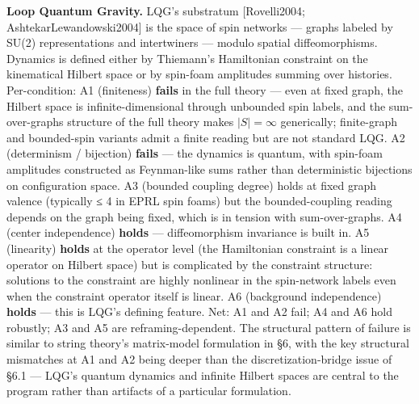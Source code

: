 \documentclass[
]{article}
\begin{document}
\textbf{Loop Quantum Gravity.} LQG's substratum {[}Rovelli2004;
AshtekarLewandowski2004{]} is the space of spin networks --- graphs
labeled by SU(2) representations and intertwiners --- modulo spatial
diffeomorphisms. Dynamics is defined either by Thiemann's Hamiltonian
constraint on the kinematical Hilbert space or by spin-foam amplitudes
summing over histories. Per-condition: A1 (finiteness) \textbf{fails} in
the full theory --- even at fixed graph, the Hilbert space is
infinite-dimensional through unbounded spin labels, and the
sum-over-graphs structure of the full theory makes \(|S| = \infty\)
generically; finite-graph and bounded-spin variants admit a finite
reading but are not standard LQG. A2 (determinism / bijection)
\textbf{fails} --- the dynamics is quantum, with spin-foam amplitudes
constructed as Feynman-like sums rather than deterministic bijections on
configuration space. A3 (bounded coupling degree) holds at fixed graph
valence (typically ≤ 4 in EPRL spin foams) but the bounded-coupling
reading depends on the graph being fixed, which is in tension with
sum-over-graphs. A4 (center independence) \textbf{holds} ---
diffeomorphism invariance is built in. A5 (linearity) \textbf{holds} at
the operator level (the Hamiltonian constraint is a linear operator on
Hilbert space) but is complicated by the constraint structure: solutions
to the constraint are highly nonlinear in the spin-network labels even
when the constraint operator itself is linear. A6 (background
independence) \textbf{holds} --- this is LQG's defining feature. Net: A1
and A2 fail; A4 and A6 hold robustly; A3 and A5 are reframing-dependent.
The structural pattern of failure is similar to string theory's
matrix-model formulation in §6, with the key structural mismatches at A1
and A2 being deeper than the discretization-bridge issue of §6.1 ---
LQG's quantum dynamics and infinite Hilbert spaces are central to the
program rather than artifacts of a particular formulation.
\end{document}
